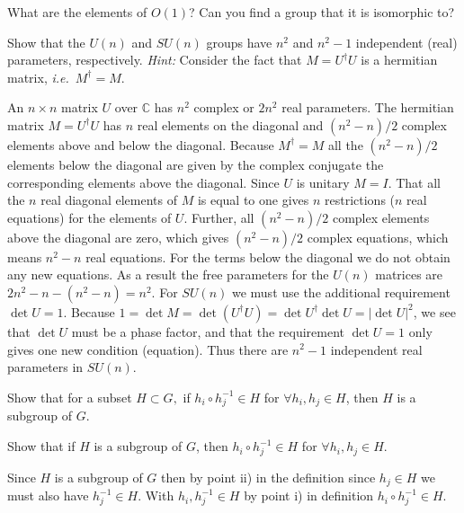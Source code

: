 \documentclass[notes.tex]{subfiles}
\begin{document}
\begin{Exercise}[]
What are the elements of $O(1)$? Can you find a group that it is isomorphic to?
\end{Exercise}

\begin{Exercise}[]
Show that the $U(n)$ and $SU(n)$ groups have $n^2$ and $n^2-1$ independent (real) parameters, respectively. {\it Hint:} Consider the fact that $M=U^\dagger U$ is a hermitian matrix, {\it i.e.}\ $M^\dagger=M$.
\end{Exercise}

\begin{Answer}
An $n\times n$ matrix $U$ over $\mathbb C$ has $n^2$ complex or $2n^2$ real parameters. The hermitian matrix $M=U^\dagger U$ has $n$ real elements on the diagonal
and $(n^2-n)/2$ complex elements above and below the diagonal. Because $M^\dagger=M$ all the $(n^2-n)/2$ elements below the diagonal are given by the complex conjugate the corresponding elements above the diagonal. Since $U$ is unitary $M=I$. That all the $n$ real diagonal elements of $M$ is equal to one gives $n$ restrictions ($n$ real equations) for the elements of $U$. Further, all $(n^2-n)/2$ complex elements above the diagonal are zero, which gives $(n^2-n)/2$ complex equations, which means $n^2-n$ real equations. For the terms below the diagonal we do not obtain any new equations. As a result the free parameters for the $U(n)$ matrices are $2n^2-n-(n^2-n)=n^2$.
For $SU(n)$ we must use the additional requirement $\det U=1$. Because $1=\det M=\det (U^\dagger U)=\det U^\dagger \det U=|\det U|^2$, we see that $\det U$ must be a phase factor, and that the requirement $\det U=1$ only gives one new condition (equation). Thus there are $n^2-1$ independent real parameters in $SU(n)$.
\end{Answer}

\begin{Exercise}[]
Show that for a subset $H\subset G,$ if $h_i \circ h_j^{-1} \in H$ for $\forall h_i, h_j\in H$, then $H$ is a subgroup of $G$.
\end{Exercise}

\begin{Exercise}[]
Show that if $H$ is a subgroup of $G$, then $h_i \circ h_j^{-1} \in H$ for $\forall h_i, h_j\in H$.
\end{Exercise}

\begin{Answer}
Since $H$ is a subgroup of $G$ then by point ii) in the definition since $h_j\in H$ we must also have $h_j^{-1} \in H$. With $h_i, h_j^{-1} \in H$ by point i) in definition $h_i  \circ h_j^{-1} \in H$.
\end{Answer}
\end{document}
